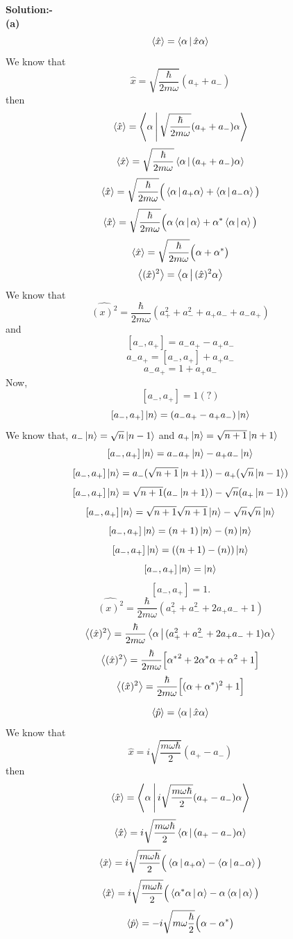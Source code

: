   \textbf{Solution:-}\\
 \hspace*{3cm}\textbf{(a)} $$\Braket{\hat{x}}=\Braket{\alpha|\hat{x}\alpha}$$
 We know that$$\hat{x}=\sqrt{\frac{\hbar}{2m\omega}}(a_{+}+a_{-})$$
 then $$\Braket{\hat{x}}=\Braket{\alpha|\sqrt{\frac{\hbar}{2m\omega}}(a_{+}+a_{-})\alpha}$$
 $$\Braket{\hat{x}}=\sqrt{\frac{\hbar}{2m\omega}}\Braket{\alpha|(a_{+}+a_{-})\alpha}$$
  $$\Braket{\hat{x}}=\sqrt{\frac{\hbar}{2m\omega}}\Big(\Braket{\alpha|a_{+}\alpha}+\Braket{\alpha|a_{-}\alpha}\big)$$
  $$\Braket{\hat{x}}=\sqrt{\frac{\hbar}{2m\omega}}\Big(\alpha\Braket{\alpha|\alpha}+{\alpha}^{*}\Braket{\alpha|\alpha}\big)$$
 $$\Braket{\hat{x}}=\sqrt{\frac{\hbar}{2m\omega}}\Big(\alpha+{\alpha}^{*}\big)$$
 $$\Braket{(\hat{x})^2}=\Braket{\alpha|(\hat{x})^2\alpha}$$
 We know that$$\hat{(x)^2}={\frac{\hbar}{2m\omega}}(a_{+}^{2}+a_{-}^{2}+a_{+}a_{-}+a_{-}a_{+})$$
 and$$ [a_{-},a_{+}]=a_{-}a_{+}-a_{+}a_{-}$$
 $$a_{-}a_{+}=[a_{-},a_{+}]+a_{+}a_{-}$$
 $$a_{-}a_{+}=1+a_{+}a_{-}$$
 Now,$$[a_{-},a_{+}]=1(?)$$
 $$ [a_{-},a_{+}]\ket{n}=(a_{-}a_{+}-a_{+}a_{-})\ket{n}$$
 We know that, $a_{-}\ket{n}=\sqrt{n}\ket{n-1}$ and  $a_{+}\ket{n}=\sqrt{n+1}\ket{n+1}$\\
  $$ [a_{-},a_{+}]\ket{n}=a_{-}a_{+}\ket{n}-a_{+}a_{-}\ket{n}$$
 $$ [a_{-},a_{+}]\ket{n}=a_{-}(\sqrt{n+1}\ket{n+1})-a_{+}(\sqrt{n}\ket{n-1})$$
  $$ [a_{-},a_{+}]\ket{n}=\sqrt{n+1}(a_{-}\ket{n+1})-\sqrt{n}(a_{+}\ket{n-1})$$
 $$ [a_{-},a_{+}]\ket{n}=\sqrt{n+1}\sqrt{n+1}\ket{n}-\sqrt{n}\sqrt{n}\ket{n}$$
  $$ [a_{-},a_{+}]\ket{n}={(n+1)}\ket{n}-{(n)}\ket{n}$$
  $$ [a_{-},a_{+}]\ket{n}={((n+1)-(n))}\ket{n}$$
  $$ [a_{-},a_{+}]\ket{n}=\ket{n}$$
  $$ [a_{-},a_{+}]=1.$$
  $$\hat{(x)^2}={\frac{\hbar}{2m\omega}}(a_{+}^{2}+a_{-}^{2}+2a_{+}a_{-}+1)$$
 $$\Braket{(\hat{x})^2}={\frac{\hbar}{2m\omega}}\Braket{\alpha|(a_{+}^{2}+a_{-}^{2}+2a_{+}a_{-}+1)\alpha}$$
 $$\Braket{(\hat{x})^2}={\frac{\hbar}{2m\omega}}\Big[{{\alpha}^*}^2+2{\alpha}^*{\alpha}+{\alpha}^2+1\Big]$$
 $$\Braket{(\hat{x})^2}={\frac{\hbar}{2m\omega}}\Big[({{\alpha}+{\alpha}^*})^2+1\Big]$$
 
 $$\Braket{\hat{p}}=\Braket{\alpha|\hat{x}\alpha}$$
 We know that$$\hat{x}=i\sqrt{\frac{m\omega\hbar}{2}}(a_{+}-a_{-})$$
 then $$\Braket{\hat{x}}=\Braket{\alpha|i\sqrt{\frac{m\omega\hbar}{2}}(a_{+}-a_{-})\alpha}$$
 $$\Braket{\hat{x}}=i\sqrt{\frac{m\omega\hbar}{2}}\Braket{\alpha|(a_{+}-a_{-})\alpha}$$
  $$\Braket{\hat{x}}=i\sqrt{\frac{m\omega\hbar}{2}}\Big(\Braket{\alpha|a_{+}\alpha}-\Braket{\alpha|a_{-}\alpha}\big)$$
  $$\Braket{\hat{x}}=i\sqrt{\frac{m\omega\hbar}{2}}\Big(\Braket{{\alpha}^{*}\alpha|\alpha}-\alpha\Braket{\alpha|\alpha}\big)$$
  $$\Braket{\hat{p}}=-i\sqrt{m\omega\frac{\hbar}{2}}\Big(\alpha-{\alpha}^{*}\big)$$

